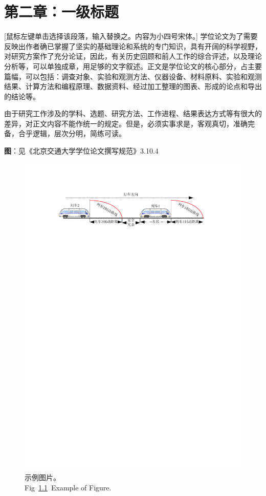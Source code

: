  \setlength{\baselineskip}{20pt}
\chapter{第二章：一级标题}
\label{cha:chap2}

[鼠标左键单击选择该段落，输入替换之。内容为小四号宋体。] 学位论文为了需要反映出作者确已掌握了坚实的基础理论和系统的专门知识，具有开阔的科学视野，对研究方案作了充分论证，因此，有关历史回顾和前人工作的综合评述，以及理论分析等，可以单独成章，用足够的文字叙述。正文是学位论文的核心部分，占主要篇幅，可以包括：调查对象、实验和观测方法、仪器设备、材料原料、实验和观测结果、计算方法和编程原理、数据资料、经过加工整理的图表、形成的论点和导出的结论等。


由于研究工作涉及的学科、选题、研究方法、工作进程、结果表达方式等有很大的差异，对正文内容不能作统一的规定。但是，必须实事求是，客观真切，准确完备，合乎逻辑，层次分明，简练可读。


\textbf{图}：见《北京交通大学学位论文撰写规范》3.10.4
\begin{figure}[!htb] %
\setlength{\belowcaptionskip}{-0.2cm} 
  \centering
  \includegraphics[scale=1]{figures/figure1.pdf}
  \caption{示例图片。\\Fig~\ref{fig:02:01}~Example of Figure.}
  \label{fig:02:01}
\end{figure}

